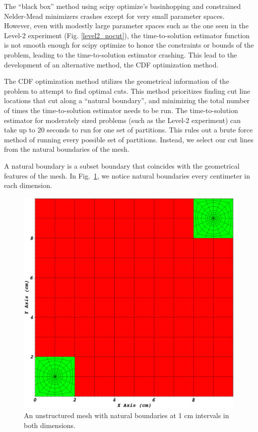 The ``black box'' method using scipy optimize's basinhopping and constrained Nelder-Mead minimizers crashes except for very small parameter spaces.
However, even with modestly large parameter spaces such as the one seen in the Level-2 experiment (Fig. \ref{level2_nocut}), the time-to-solution estimator function is not smooth enough for scipy optimize to honor the constraints or bounds of the problem, leading to the time-to-solution estimator crashing.
This lead to the development of an alternative method, the CDF optimization method.

The CDF optimization method utilizes the geometrical information of the problem to attempt to find optimal cuts. This method prioritizes finding cut line locations that cut along a ``natural boundary'', and minimizing the total number of times the time-to-solution estimator needs to be run.
The time-to-solution estimator for moderately sized problems (such as the Level-2 experiment) can take up to 20 seconds to run for one set of partitions.
This rules out a brute force method of running every possible set of partitions.
Instead, we select our cut lines from the natural boundaries of the mesh.

A natural boundary is a subset boundary that coincides with the geometrical features of the mesh. In Fig.~\ref{natural_boundary_example}, we notice natural boundaries every centimeter in each dimension.
 \begin{figure}[h]
\centering
\includegraphics[scale=0.2]{../figures/spiderweb_10x10_sparse.png}
\caption{An unstructured mesh with natural boundaries at 1 cm intervals in both dimensions.}
\label{natural_boundary_example}
\end{figure}

